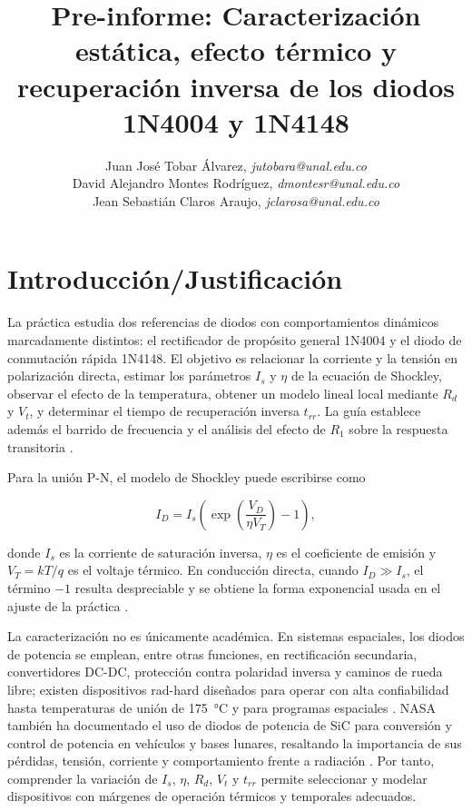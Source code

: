 \documentclass[journal,a4paper]{IEEEtran}
\begin{document}
\title{Pre-informe: Caracterización estática, efecto térmico y recuperación inversa de los diodos 1N4004 y 1N4148}

\author{
Juan José Tobar Álvarez, \textit{jutobara@unal.edu.co}\\
David Alejandro Montes Rodríguez, \textit{dmontesr@unal.edu.co}\\
Jean Sebastián Claros Araujo, \textit{jclarosa@unal.edu.co}
}

\maketitle

\section{Introducción/Justificación}

La práctica estudia dos referencias de diodos con comportamientos dinámicos marcadamente distintos: el rectificador de propósito general 1N4004 y el diodo de conmutación rápida 1N4148. El objetivo es relacionar la corriente y la tensión en polarización directa, estimar los parámetros $I_s$ y $\eta$ de la ecuación de Shockley, observar el efecto de la temperatura, obtener un modelo lineal local mediante $R_d$ y $V_t$, y determinar el tiempo de recuperación inversa $t_{rr}$. La guía establece además el barrido de frecuencia y el análisis del efecto de $R_1$ sobre la respuesta transitoria \cite{guia}.

Para la unión P-N, el modelo de Shockley puede escribirse como

\begin{equation}
I_D=I_s\left(\exp\!\left(\frac{V_D}{\eta V_T}\right)-1\right),
\label{eq:shockley}
\end{equation}

donde $I_s$ es la corriente de saturación inversa, $\eta$ es el coeficiente de emisión y $V_T=kT/q$ es el voltaje térmico. En conducción directa, cuando $I_D\gg I_s$, el término $-1$ resulta despreciable y se obtiene la forma exponencial usada en el ajuste de la práctica \cite{sedra}.

La caracterización no es únicamente académica. En sistemas espaciales, los diodos de potencia se emplean, entre otras funciones, en rectificación secundaria, convertidores DC-DC, protección contra polaridad inversa y caminos de rueda libre; existen dispositivos rad-hard diseñados para operar con alta confiabilidad hasta temperaturas de unión de \SI{175}{\celsius} y para programas espaciales \cite{stspace}. NASA también ha documentado el uso de diodos de potencia de SiC para conversión y control de potencia en vehículos y bases lunares, resaltando la importancia de sus pérdidas, tensión, corriente y comportamiento frente a radiación \cite{nasa}. Por tanto, comprender la variación de $I_s$, $\eta$, $R_d$, $V_t$ y $t_{rr}$ permite seleccionar y modelar dispositivos con márgenes de operación térmicos y temporales adecuados.
\end{document}
